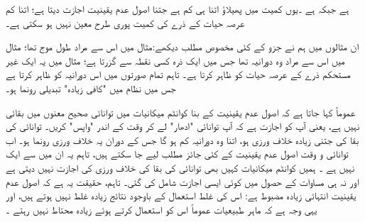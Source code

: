 ہے جبکہ    ہے ۔یوں کمیت میں پھیلاؤ اتنا  ہی کم ہے جتنا اصول  عدم یقینیت  اجازت دیتا ہے؛  اتنا کم عرصہ حیات کے ذرے کی کمیت پوری طرح معین  نہیں ہو سکتی ہے۔

 ان مثالوں میں ہم نے جزو   کے کئی مخصوص مطلب دیکھے:مثال  میں اس سے مراد طول  موج تھا؛  مثال   میں اس سے مراد وہ دورانیہ تھا جس میں ایک ذرہ کسی نقطہ  سے گزرتا ہے؛  مثال   میں یہ ایک غیر مستحکم ذرے کے  عرصہ حیات کو ظاہر کرتا ہے۔   تاہم   تمام صورتوں  میں  اس دورانیہ کو ظاہر کرتا ہے جس میں نظام میں "کافی زیادہ"  تبدیلی رونما ہو۔

عموماً کہا جاتا ہے کہ اصول  عدم یقینیت  کے بنا کوانٹم میکانیات میں توانائی صحیح معنوں میں بقائی نہیں ہے،  یعنی آپ کو اجازت ہے کہ آپ توانائی   "ادھار"  لے کر وقت  کے اندر "واپس" کریں۔  توانائی کی بقا  کی    جتنی زیادہ خلاف ورزی  ہو،  اتنا وہ    دورانیہ کم ہو گا جس کے دوران یہ خلاف ورزی رونما ہو۔ اب توانائی و وقت  اصول  عدم یقینیت کے کئی جائز مطلب لیے جا سکتے ہیں، تاہم   یہ ان میں   سے ایک نہیں  ہے ۔ ہمیں کوانٹم میکانیات کہیں بھی   توانائی  کی بقا  کی خلاف ورزی کی اجازت نہیں دیتی ہے اور نہ ہی
 مساوات    کے حصول میں کوئی ایسی اجازت شامل کی گئی۔  تاہم، حقیقت یہ ہے کہ  اصول عدم یقینیت  انتہائی زیادہ مضبوط ہے:  اس کی غلط استعمال کے باوجود نتائج زیادہ غلط نہیں ہوتے ہیں،  اور یہی وجہ ہے کہ ماہر طبیعیات عموماً اس کو استعمال کرتے ہوئے زیادہ محتاط نہیں رہتے ۔
 
